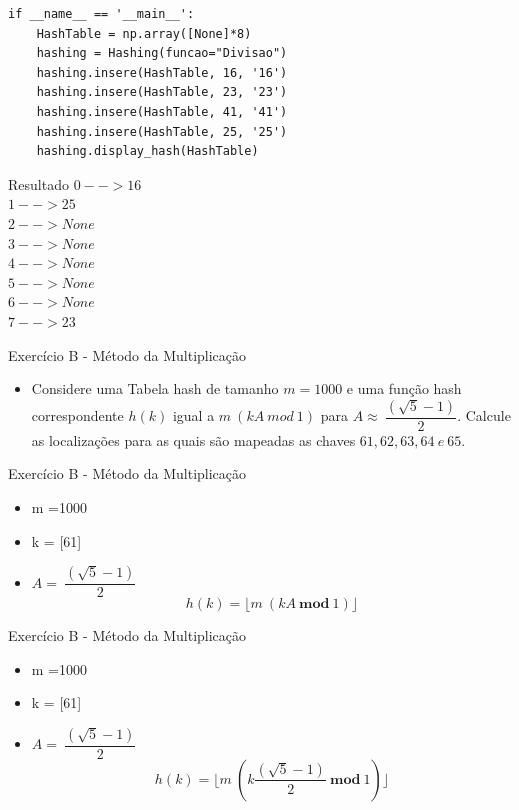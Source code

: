 \documentclass{beamer}
\begin{document}
\begin{frame}[fragile]{}
\footnotesize
\begin{lstlisting}[style=PythonStyle]
if __name__ == '__main__':
    HashTable = np.array([None]*8)
    hashing = Hashing(funcao="Divisao")
    hashing.insere(HashTable, 16, '16')
    hashing.insere(HashTable, 23, '23')
    hashing.insere(HashTable, 41, '41')
    hashing.insere(HashTable, 25, '25')
    hashing.display_hash(HashTable)    
\end{lstlisting}
\footnotesize
\begin{block}{Resultado}
$0 --> 16$ \\
$1 --> 25$ \\
$2 --> None$\\
$3 --> None$\\
$4 --> None$\\
$5 --> None$\\
$6 --> None$\\
$7 --> 23$\\
\end{block}

\end{frame} 

\begin{frame}{Exercício B - Método da Multiplicação}
\begin{itemize}
 \item Considere uma Tabela hash de tamanho $m = 1000$ e uma função hash correspondente $h(k)$ igual a $m \ (k A\ mod \ 1)$ para $A \approx \ \dfrac{(\sqrt{5}-1)}{2}$. Calcule as localizações para as quais são mapeadas as chaves $61, 62, 63, 64 \ e \ 65$.

\end{itemize}
\end{frame}

\begin{frame}{Exercício B - Método da Multiplicação}
\begin{itemize}
 \item m =1000
 \item k = [61]
 \item $A = \ \dfrac{(\sqrt{5}-1)}{2}$ 
 $$h(k) = \lfloor m \ (kA \ \mathbf{mod} \ 1)\rfloor$$  
\end{itemize}
\end{frame}

\begin{frame}{Exercício B - Método da Multiplicação}
\begin{itemize}
 \item m =1000
 \item k = [61]
 \item $A = \ \dfrac{(\sqrt{5}-1)}{2}$ 
 $$h(k) = \lfloor m \ (k\dfrac{(\sqrt{5}-1)}{2} \ \mathbf{mod} \ 1)\rfloor$$  
\end{itemize}
\end{frame}
\end{document}
